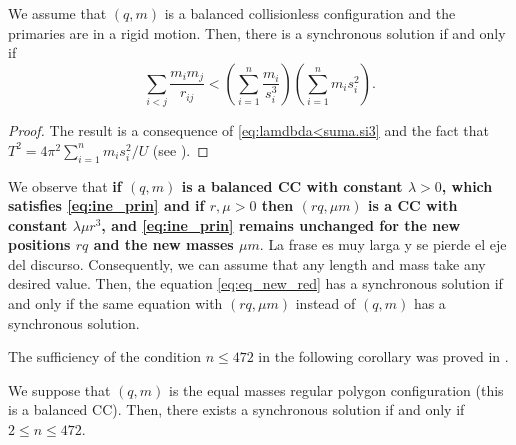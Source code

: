 \documentclass[smallcondensed]{svjour3}
\begin{document}
\begin{corollary}
We assume that $(q,m)$ is a balanced collisionless configuration and  the primaries are in a rigid motion. Then, there is a synchronous solution if and only if
 \begin{equation}\label{eq:ine_prin}
 \sum_{i<j}\frac{m_im_j}{r_{ij}}<\left(\sum_{i=1}^n\frac{m_i}{s_i^3}\right)\left(\sum_{i=1}^nm_is_i^2\right).
\end{equation}
\end{corollary}

\begin{proof}
The result is a consequence of \eqref{eq:lamdbda<suma.si3} and the fact that $T^2=4\pi^2 \sum_{i=1}^{n}m_is_i^2/U$   (see \cite[p. 109]{JaumeLlibre276}).
\end{proof}


\begin{remark}\label{com:sincronicas}
We observe that \textbf{if $(q,m)$  is a  balanced  CC  with constant $\lambda>0$, which satisfies \eqref{eq:ine_prin} and if $r,\mu>0$  then  $(rq,\mu m)$ is a CC with constant $\lambda \mu r^3$, and \eqref{eq:ine_prin} remains unchanged for the new positions $rq$ and the new masses $\mu m$}. \textcolor[rgb]{1,0,0}{La frase es muy larga y se pierde el eje del discurso}. Consequently, we can assume that any  length and  mass take any  desired value. Then, the equation \eqref{eq:eq_new_red} has a synchronous solution if and only if the same equation with $(rq,\mu m)$ instead of $(q,m)$ has a synchronous solution.
\end{remark}





The sufficiency of the condition $n\leq 472$ in the following corollary  was proved in \cite{li2013characterization}.

\begin{corollary}\label{cor:nleq472}
We suppose that $(q,m)$ is the equal masses regular polygon configuration  (this is a balanced CC). Then, there exists a synchronous solution if and only if $2\leq n\leq 472$.
\end{corollary}
\end{document}
